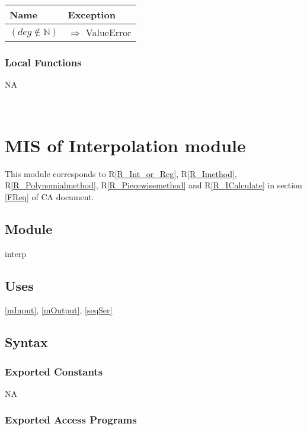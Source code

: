 \documentclass[12pt, titlepage]{article}
\begin{document}
\begin{tabular}{p{12cm} p{4.75cm}}
	
	\toprule
	\textbf{Name}&\textbf{Exception}\\
	\midrule
	
	
	$ (deg \notin \mathbb{N})$ & $\Rightarrow$ ValueError\\

	
	\bottomrule
\end{tabular}


\subsubsection{Local Functions}

NA




~\newpage

\section{MIS of Interpolation module} \label{mInterp}

This module corresponds to R\ref{R_Int_or_Reg}, R\ref{R_Imethod}, 
R\ref{R_Polynomialmethod}, R\ref{R_Piecewisemethod} and R\ref{R_ICalculate}
in section \ref{FReq} of CA document.


\subsection{Module}

interp

\subsection{Uses}

\ref{mInput}, \ref{mOutput}, \ref{seqSer}


\subsection{Syntax}

\subsubsection{Exported Constants}


NA

\subsubsection{Exported Access Programs}
\end{document}
